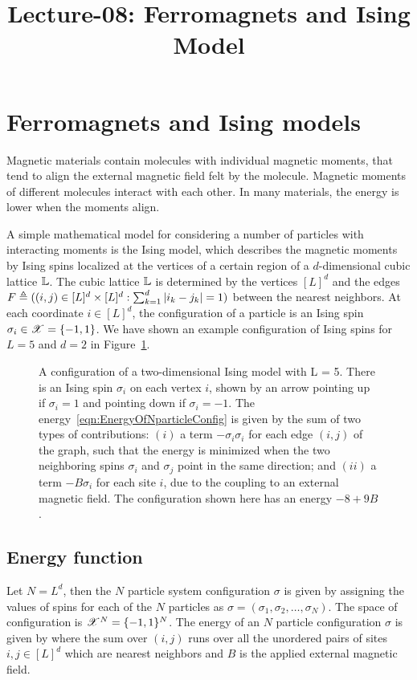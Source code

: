 \documentclass[letterpaper,english,10pt]{article}
\title{Lecture-08: Ferromagnets and Ising Model}
\begin{document}
\maketitle
\section{Ferromagnets and Ising models}
Magnetic materials contain molecules with individual magnetic moments, that tend to align the external magnetic field felt by the molecule. 
Magnetic moments of different molecules interact with each other. 
In many materials, the energy is lower when the moments align. 

A simple mathematical model for considering a number of particles with interacting moments is the Ising model, which describes the magnetic moments by Ising spins localized at the vertices of a certain region of a $d$-dimensional cubic lattice $\mathbb{L}$. 
The cubic lattice $\mathbb{L}$ is determined by the vertices $[L]^d$ and the edges $F \triangleq ((i,j) \in [L]^d \times [L]^d: \sum_{k=1}^d\left\lvert i_k-j_k\right\rvert = 1)$ between the nearest neighbors.  
At each coordinate $i \in [L]^d$, the configuration of a particle is an Ising spin $\sigma_i \in \mathscr{X} = \{-1,1\}$. 
We have shown an example configuration of Ising spins for $L=5$ and $d=2$ in Figure~\ref{figure:IsingSpins}. 

\begin{figure}[hhh]
\centering

\caption{A configuration of a two-dimensional Ising model with L = 5. There is an Ising spin $\sigma_i$ on each vertex $i$, shown by an arrow pointing up if $\sigma_i = 1$ and pointing down if $\sigma_i = -1$.
The energy~\eqref{eqn:EnergyOfNparticleConfig}  is given by the sum of two types of contributions: 
$(i)$ a term $-\sigma_i\sigma_i$ for each edge $(i, j)$ of the graph, such that the energy is minimized when the two neighboring spins $\sigma_i$ and $\sigma_j$ point in the same direction; 
and $(ii)$ a term $-B\sigma_i$ for each site $i$, due to the coupling to an external magnetic field. 
The configuration shown here has an energy $-8+9B$.}
\label{figure:IsingSpins}
\end{figure}

\subsection{Energy function}
Let $N = L^d$, then the $N$ particle system configuration $\sigma$ is given by assigning the values of spins  for each of the $N$ particles as $\sigma = (\sigma_1, \sigma_2, \dots, \sigma_N)$. 
The space of configuration is $\mathscr{X}^N = \{-1,1\}^N$. 
The energy of an $N$ particle configuration $\sigma$ is given by
where the sum over $(i,j)$ runs over all the unordered pairs of sites $i,j \in [L]^d$ which are nearest neighbors and $B$ is the applied external magnetic field. 
\end{document}
